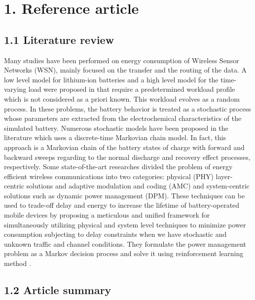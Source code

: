 \documentclass[a4paper, 12pt]{report}
\begin{document}
\chapter*{1. Reference article}

\section*{1.1 Literature review}

Many studies have been performed on energy consumption of Wireless Sensor Networks (WSN), mainly
focused on the transfer and the routing of the data. A low level model for lithium-ion batteries and a high level model for the time-varying load were proposed in \cite{Salodkar-2008} that require a predetermined workload profile which is not considered as a priori known. This workload evolves as a random process. In these problems, the battery behavior is treated as a stochastic process whose parameters are extracted from the electrochemical characteristics of the simulated battery. Numerous stochastic models have been proposed in the literature which uses a discrete-time Markovian chain model. In fact, this approach is a Markovian chain of the battery states of charge with forward and backward sweeps regarding to the normal discharge and recovery effect processes, respectively.
Some state-of-the-art researches divided the problem of energy efficient wireless communications into two categories: physical (PHY) layer-centric solutions and adaptive modulation and coding (AMC) and system-centric solutions such as dynamic power management (DPM). These techniques can be used to trade-off delay and energy to increase the lifetime of battery-operated mobile devices by proposing a meticulous and unified framework for simultaneously utilizing
physical and system level techniques to minimize power consumption subjecting to delay constraints when we have stochastic and unknown traffic and channel conditions. They formulate the power management problem as a Markov decision process and solve it using reinforcement learning method \cite{Mastronarde-2011}.

\section*{1.2 Article summary}
\end{document}
